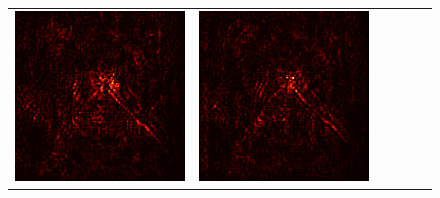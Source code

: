 \documentclass[preprint,12pt]{elsarticle}
\begin{document}
\begin{figure}[p]
\begin{tabular}{cccccc}
  \includegraphics[scale=\scale]{../visualizations/examples/imagenette/resnet18/positive_saliency_map/7.png} & 
  \includegraphics[scale=\scale]{../visualizations/examples/imagenette/resnet18/negative_saliency_map/7.png} & 

\end{tabular}
\end{figure}
\end{document}
